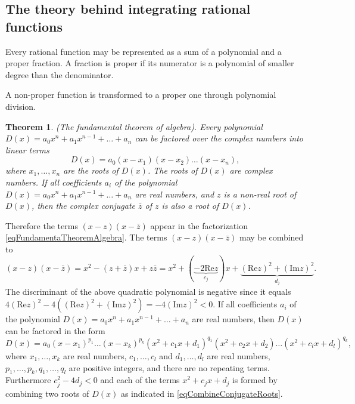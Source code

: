 \documentclass[12pt]{book}
\renewcommand{\Im}{\mathrm{Im}}
\renewcommand{\Re}{\mathrm{Re}}
\newtheorem{theorem}{Theorem}[section]
\begin{document}
\subsection{The theory behind integrating rational functions}
Every rational function may be represented as a sum of a polynomial and a proper fraction. A fraction is proper if its numerator is a polynomial of smaller degree than the denominator. 

A non-proper function is transformed to a proper one through polynomial 
division.

\begin{theorem}(The fundamental theorem of algebra). Every polynomial $D(x)= a_0x^n+a_{1}x^{n-1}+\dots + a_n$ can be factored over the complex numbers into linear terms 
\begin{equation}\label{eqFundamentaTheoremAlgebra}
D(x)=a_0(x-x_1)(x-x_2)\dots (x-x_n),
\end{equation}
where $x_1,\dots, x_n$ are the roots of $D(x)$. The roots of $D(x)$ are complex numbers.
If all coefficients $a_i$ of the polynomial $D(x)= a_0x^n+a_{1}x^{n-1}+\dots + a_n$ are real numbers, and $z$ is a non-real root of $D(x)$, then the complex conjugate $\bar z$ of $z$ is also a root of $D(x)$. 
\end{theorem}

Therefore the terms  $(x-z)(x-\bar z)$ appear in the factorization \eqref{eqFundamentaTheoremAlgebra}. The terms $(x-z)(x-\bar z)$ may be combined to 
\begin{equation}\label{eqCombineConjugateRoots}
(x-z)(x-\bar z)= x^2- (z+\bar z)x + z\bar z = x^{2}+ (\underbrace{-2\Re z}_{c_j})x+ \underbrace{(\Re z)^2+(\Im z)^2}_{d_j}.
\end{equation}
The discriminant of the above quadratic polynomial is negative since it equals $4(\Re z)^2- 4((\Re z)^2+(\Im z)^2)= -4(\Im z)^2<0$. 
If all coefficients $a_i$ of the polynomial $D(x)= a_0x^n+a_{1}x^{n-1}+\dots + a_n$ are real numbers, then $D(x)$ can be factored in the form 
\begin{equation}\label{eqFactorOverReals}
D(x)= a_0(x-x_1)^{p_1}\dots (x-x_k)^{p_k} (x^2+c_1x+d_1)^{q_1}(x^2+c_2x+d_2)\dots (x^2+c_lx +d_l)^{q_k},
\end{equation}
where $x_1, \dots, x_k$ are real numbers, $c_1, \dots, c_l$ and $d_1,\dots, d_l$ are real numbers, $p_1,\dots, p_k, q_1, \dots, q_l$ are positive integers, and there are no repeating terms. Furthermore $c_j^2-4d_j<0$ and each of the terms $x^2+c_j x+d_j$ is formed by combining two  roots of $D(x)$ as indicated in \eqref{eqCombineConjugateRoots}. 
\end{document}
